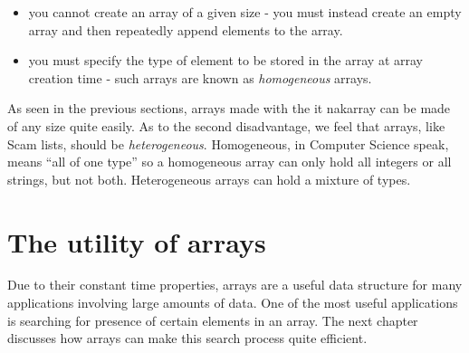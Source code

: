 \begin{itemize}
\item
    you cannot create an array of a given size - you must
    instead create an empty array and then repeatedly append
    elements to the array.
\item
    you must specify the type of element to  be stored in
    the array at array creation time - such arrays are known
    as {\it homogeneous} arrays.
\end{itemize}
        
As seen in the previous sections,
arrays made with the {it nakarray} can
be made of any size quite easily.
As to the second disadvantage,
we feel that arrays, 
like Scam lists, should be
{\it heterogeneous}.
Homogeneous, in Computer Science speak, means ``all of one type''
so a homogeneous array can only hold all integers or all strings,
but not both. Heterogeneous arrays can hold a mixture of types.

\section{The utility of arrays}

Due to their constant time properties, arrays are
a useful data structure for many applications involving
large amounts of data. One of the most useful applications
is searching for presence of certain elements in an array.
The next chapter discusses how arrays can make this
search process quite efficient.
